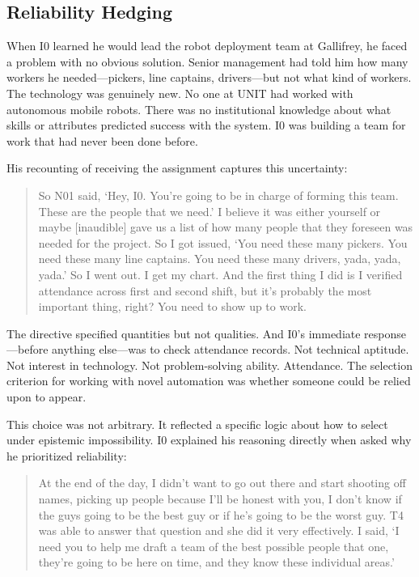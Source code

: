\documentclass[12pt]{article}
\begin{document}
\subsection{Reliability Hedging}

When I0 learned he would lead the robot deployment team at Gallifrey, he faced a problem with no obvious solution. Senior management had told him how many workers he needed---pickers, line captains, drivers---but not what kind of workers. The technology was genuinely new. No one at UNIT had worked with autonomous mobile robots. There was no institutional knowledge about what skills or attributes predicted success with the system. I0 was building a team for work that had never been done before.

His recounting of receiving the assignment captures this uncertainty:

\begin{quote}
So N01 said, `Hey, I0. You're going to be in charge of forming this team. These are the people that we need.' I believe it was either yourself or maybe [inaudible] gave us a list of how many people that they foreseen was needed for the project. So I got issued, `You need these many pickers. You need these many line captains. You need these many drivers, yada, yada, yada.' So I went out. I get my chart. And the first thing I did is I verified attendance across first and second shift, but it's probably the most important thing, right? You need to show up to work.
\end{quote}

The directive specified quantities but not qualities. And I0's immediate response---before anything else---was to check attendance records. Not technical aptitude. Not interest in technology. Not problem-solving ability. Attendance. The selection criterion for working with novel automation was whether someone could be relied upon to appear.

This choice was not arbitrary. It reflected a specific logic about how to select under epistemic impossibility. I0 explained his reasoning directly when asked why he prioritized reliability:

\begin{quote}
At the end of the day, I didn't want to go out there and start shooting off names, picking up people because I'll be honest with you, I don't know if the guys going to be the best guy or if he's going to be the worst guy. T4 was able to answer that question and she did it very effectively. I said, `I need you to help me draft a team of the best possible people that one, they're going to be here on time, and they know these individual areas.'
\end{quote}
\end{document}
